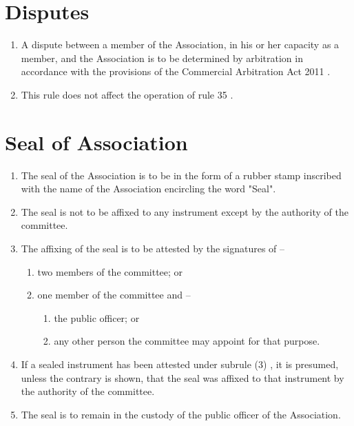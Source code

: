 \documentclass[a4paper,11pt]{article}
\begin{document}
\section{Disputes}
\begin{enumerate}
	\item A dispute between a member of the Association, in his or her capacity as a member, and the Association is to be determined by arbitration in accordance with the provisions of the Commercial Arbitration Act 2011 .
	\item This rule does not affect the operation of rule 35 .
\end{enumerate}

\section{Seal of Association}
\begin{enumerate}
	\item The seal of the Association is to be in the form of a rubber stamp inscribed with the name of the Association encircling the word "Seal".
	\item The seal is not to be affixed to any instrument except by the authority of the committee.
	
	\item The affixing of the seal is to be attested by the signatures of --
	\begin{enumerate}
		\item two members of the committee; or
		\item one member of the committee and --
		\begin{enumerate}
			\item the public officer; or
			\item any other person the committee may appoint for that purpose.
		\end{enumerate}
	\end{enumerate}
	
	\item If a sealed instrument has been attested under subrule (3) , it is presumed, unless the contrary is shown, that the seal was affixed to that instrument by the authority of the committee.
	\item The seal is to remain in the custody of the public officer of the Association.
\end{enumerate}
\end{document}
